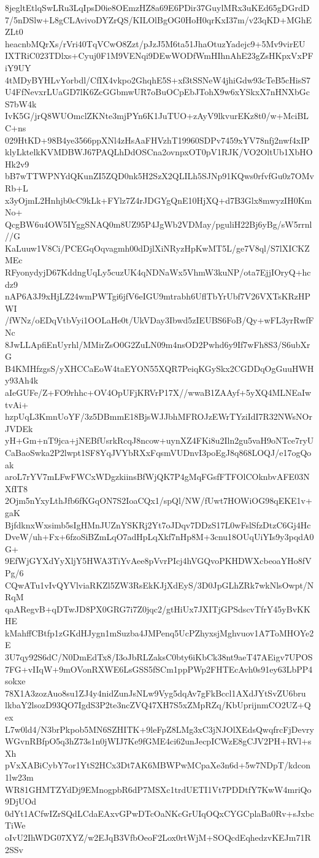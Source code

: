 8jegltEtlqSwLRu3LqIpsD0ie8OEmzHZ8a69E6PDir37GuylMRx3uKEd65gDGrdD
7/5nDSlw+L8gCLAvivoDYZrQS/KILOlBgOG0HoH0qrKxI37m/v23qKD+MGhEZLt0
heacnbMQrXs/rVri40TqVCwO8Zzt/pJzJ5M6ta51JhaOtuzYadejc9+5Mv9virEU
IXTRiC023TDlxs+Cyuj0F1M9VENqi9DEwWODfWmHIhnAhE23gZsHKpxVxPFiY9UY
4tMDyBYHLvYorbdl/CfIX4vkpo2GhqhE5S+xf3tSSNeW4jhiGdw93cTeB5cHisS7
U4FfNevxrLUaGD7lK6ZcGGbmwUR7oBuOCpEbJTohX9w6xYSkxX7nHNXbGcS7bW4k
IvK5G/jrQ8WUOmclZKNte3mjPYn6K1JuTUO+zAyV9lkvurEKz8t0/w+MciBLC+ns
029HtKD+98B4ye3566ppXNl4zHsAaFHVzhT19960SDPv7459xYV78nfj2nwf4xIP
klyLktelkKVMDBWJ67PAQLhDdOSCna2ovnpxOT0pV1RJK/VO2OltUb1XbHOHk2v9
bB7wTTWPNYdQKunZI5ZQD0nk5H2SzX2QLILh5SJNp91KQws0rfvfGu0z7OMvRb+L
x3yOjmL2Hnhjb0cC9kLk+FYlz7Z4rJDGYgQnE10HjXQ+d7B3Glx8mwyzIH0KmNo+
QcgBW6u4OW5IYggSNAQ0m8UZ95P4JgWb2VDMay/pguliH22Bj6yBg/sW5rrnl//G
KaLuuw1V8Ci/PCEGqOqvagmh00dDjlXiNRyzHpKwMT5L/ge7V8ql/S7lXICKZMEc
RFyonydyjD67KddngUqLy5cuzUK4qNDNaWx5VhmW3kuNP/ota7EjjIOryQ+hcdz9
nAP6A3J9xHjLZ24wmPWTgi6jfV6eIGU9mtrabh6UflTbYrUbf7V26VXTsKRzHPWI
/fWNz/oEDqVtbVyi1OOLaHe0t/UkVDay3Ibwd5zIEUBS6FoB/Qy+wFL3yrRwfFNc
8JwLLApfiEnUyrhl/MMirZsO0G2ZuLN09m4nsOD2Pwhd6y9If7wFh8S3/S6ubXrG
B4KMHfzgsS/yXHCCaEoW4taEYON55XQR7PeiqKGySkx2CGDDqOgGuuHWHy93Ah4k
aIeGUFe/Z+FO9rhhc+OV4OpUFjKRVrP17X//wwaB1ZAAyf+5yXQ4MLNEaIwtvAi+
hzpUqL3KmnUoYF/3z5DBmmE18BjsWJJbhMFROJzEWrTYziIdI7R32NWsNOrJVDEk
yH+Gm+nT9jca+jNEBfUsrkRcqJ8ncow+uynXZ4FKi8u2Iln2gu5vaH9oNTce7ryU
CaBaoSwka2P2lwpt1SF8YqJVYbRXxFqsmVUDnvI3poEgJ8q868LOQJ/e17ogQoak
aroL7rYV7mLFwFWCxWDgzkiinsBfWjQK7P4gMqFGsfFTFOlCOknbvAFE03NXfIT8
2Ojm5nYxyLthJfb6fKGqON7S2IoaCQx1/spQl/NW/fUwt7HOWiOG98qEKE1v+gaK
BjfdknxWxsimb5sIgHMnJUZnYSKRj2Yt7oJDqv7DDzS17L0wFslSfzDtzC6Gj4Hc
DveW/uh+Fx+6fzoSiBZmLqO7adHpLqXkf7nHp8M+3cnu18OUqUiYIs9y3pqdA0G+
9EfWjGYXdYyXljY5HWA3TiYvAee8pVvrPIcj4hVGQvoPKHDWXcbeoaYHo8fVPg/6
CQwATu1vIvQYVlviaRKZl5ZW3RsEkKJjXdEyS/3D0JpGLhZRk7wkNlsOwpt/NRqM
qaARegvB+qDTwJD8PX0GRG7i7Z0jqc2/gtHiUx7JXITjGPSdscvTfrY45yBvKKHE
kMahffCBtfp1zGKdHJygn1mSuzba4JMPenq5UcPZhyxsjMghvuov1A7ToMHOYe2E
3U7qy92S6dC/N0DmEdTx8/I3oJbRLZaksC0bty6iKbCk38nt9aeT47AEigv7UPOS
7FG+vIIqW+9mOVonRXWE6LsGSS5fSCm1ppPWp2FHTEcAvh0s91ey63LbPP4sokxe
78X1A3zozAuo8su1ZJ4y4nidZunJsNLw9Vyg5dqAv7gFkBccl1AXdJYtSvZU6bru
lkbaY2lsozD93QO7IgdS3P2te3ncZVQ47XH7S5xZMpRZq/KbUprijnmCO2UZ+Qex
L7w0ld4/N3brPkpob5MN6SZHITK+9leFpZ8LMg3xC3jNJOlXEdsQwqfrcFjDevry
WGvnRBfpO5q3hZ73s1n0jWIJ7Ke9fGME4ci62unJecpICWzE8gCJV2PH+RVl+sXh
pVxXABiCybY7or1YtS2HCx3Dt7AK6MBWPwMCpaXe3n6d+5w7NDpT/kdcon1lw23m
WR81GHMTZYdDj9EMnogpbR6dP7MSXc1trdUETI1Vt7PDDtfY7KwW4mriQo9DjUOd
0dYt1ACfwIZrSQdLCdaEAxvGPwDTcOaNKcGrUIqOQxCYGCplaBa0Rv+sJxbcTiWe
oIvU2IhWDG07XYZ/w2EJqB3VfbOeoF2Lox0rtWjM+SOQcdEqhedzvKEJm71R2SSv
